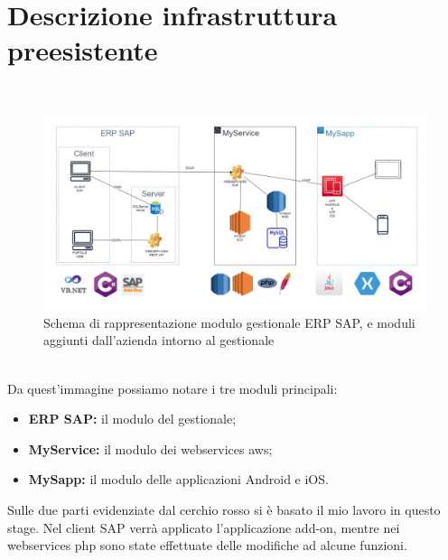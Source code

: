 
\chapter{Descrizione infrastruttura preesistente}
\label{cap:descrizione-architettura}

\\
\begin{figure}[!h] 
	\centering 
	\includegraphics[scale = 0.4]{immagini/architettura-globale.png} 
	\caption{Schema di rappresentazione modulo gestionale ERP SAP, e moduli aggiunti dall'azienda intorno al gestionale}
\end{figure}\\
Da quest'immagine possiamo notare i tre moduli principali:
\begin{itemize}
	\item \textbf{ERP SAP:} il modulo del gestionale;
	\item \textbf{MyService:} il modulo dei webservices \gls{aws};
	\item \textbf{MySapp:} il modulo delle applicazioni Android e iOS.\\
\end{itemize}
Sulle due parti evidenziate dal cerchio rosso si è basato il mio lavoro in questo stage.
Nel client SAP verrà applicato l'applicazione add-on, mentre nei webservices php sono state effettuate delle modifiche ad alcune funzioni.
